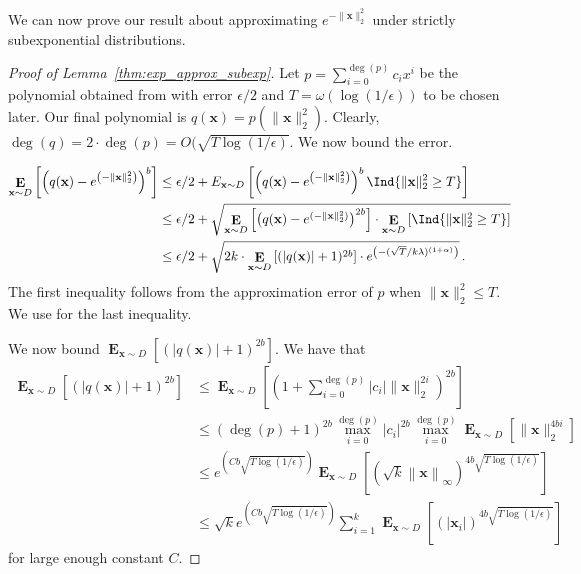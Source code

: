 \documentclass{theoretics}
\newcommand\twonorm[1]{\|#1\|_2}
\newcommand\norm[1]{\left\| #1 \right\|}
\renewcommand\vec[1]{\mathbf{#1}}
\DeclareMathOperator*{\E}{\mathbf{E}}
\newcommand{\1}{\Ind}
\newcommand{\x}{\vec x}
\begin{document}
We can now prove our result about approximating $e^{-\twonorm{\x}^2}$ under strictly subexponential distributions.
\begin{proof}[Proof of Lemma~\ref{thm:exp_approx_subexp}]
\label{proof:exp_approx_subexp}
    Let $p=\sum_{i=0}^{\deg(p)}c_ix^i$ be the polynomial obtained from  with  error $\epsilon/2$ and $T=\omega(\log(1/\epsilon))$ to be chosen later. Our final polynomial is $q(\x)=p\left(\twonorm{\x}^2\right)$. Clearly, $\deg(q)=2\cdot \deg(p)=O(\sqrt{T\log(1/\epsilon)}$. We now bound the error.

    \begin{align*}
        \E_{\x\sim D}\left[ \left(q(\x)-e^{\left(-\twonorm{\x}^2\right)}\right)^b\right]&\leq \epsilon/2+E_{\x\sim D}\left[\left(q(\x)-e^{\left(-\twonorm{\x}^2\right)}\right)^b\1\{\twonorm{\x}^2\geq T\}\right]\\
        &\leq\epsilon/2+ \sqrt{\E_{\x\sim D}\left[\left(q(\x)-e^{(-\twonorm{\x}^2)}\right)^{2b}\right]\cdot  \E_{\x\sim D}\left[\1\{\twonorm{\x}^2\geq T\}\right]}\\
        &\leq \epsilon/2+ \sqrt{2k\cdot \E_{\x\sim D}\left[(|q(\x)|+1)^{2b}\right]\cdot e^{\left(-(\sqrt{T}/k\lambda)^{(1+\alpha)}\right)}} \,.
     \end{align*}
     The first inequality follows from the approximation error of $p$ when $\twonorm{\x}^2\leq T$. We use  for the last inequality.

     We now bound $\E_{\x\sim D}\left[(|q(\x)|+1)^{2b}\right]$. We have that
     \begin{align*}
        \E_{\x\sim D}[(|q(\x)|+1)^{2b}]&\leq \E_{\x\sim D}\left[\left(1+\sum_{i=0}^{\deg(p)}|c_i|\twonorm{\x}^{2i}\right)^{2b}\right]\\
        &\leq (\deg(p)+1)^{2b}\max_{i=0}^{\deg(p)}|c_i|^{2b}\max_{i=0}^{\deg(p)}\E_{\x\sim D}\left[\twonorm{\x}^{4bi}\right]\\
        &\leq e^{\left(Cb\sqrt{T\log(1/\epsilon)}\right)} \E_{\x\sim D}\left[\left(\sqrt{k}\norm{\x}_\infty\right)^{4b\sqrt{T\log(1/\epsilon)}}\right]\\
        &\leq \sqrt{k}e^{\left(Cb\sqrt{T\log(1/\epsilon)}\right)}  \sum_{i=1}^{k}\E_{\x\sim D}\left[\left(|\x_i|\right)^{4b\sqrt{T\log(1/\epsilon)}}\right]
     \end{align*} for large enough constant $C$.


\end{proof}
\end{document}
